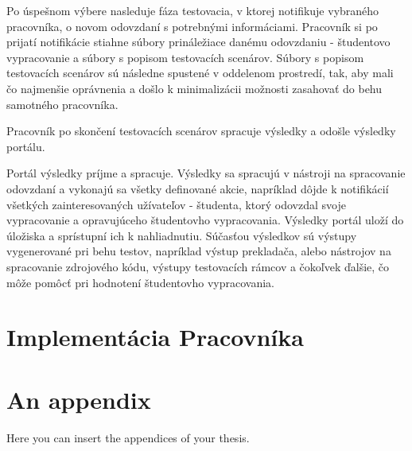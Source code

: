 \documentclass[
  digital, %
  twoside, %
  table,   %
  lof,     %
  lot,     %
]{fithesis3}
\begin{document}
Po úspešnom výbere nasleduje fáza testovacia, v ktorej notifikuje vybraného pracovníka, o novom odovzdaní s potrebnými informáciami. Pracovník si po prijatí notifikácie stiahne súbory prináležiace danému odovzdaniu - študentovo vypracovanie a súbory s popisom testovacích scenárov. Súbory s popisom testovacích scenárov sú následne spustené v oddelenom prostredí, tak, aby mali čo najmenšie oprávnenia a došlo k minimalizácii možnosti zasahovať do behu samotného pracovníka.

Pracovník po skončení testovacích scenárov spracuje výsledky a odošle výsledky portálu.

Portál výsledky príjme a spracuje. Výsledky sa spracujú v nástroji na spracovanie odovzdaní a vykonajú sa všetky definované akcie, napríklad dôjde k notifikácií všetkých zainteresovaných užívateľov - študenta, ktorý odovzdal svoje vypracovanie a opravujúceho študentovho vypracovania. Výsledky portál uloží do úložiska a sprístupní ich k nahliadnutiu. Súčasťou výsledkov sú výstupy vygenerované pri behu testov, napríklad výstup prekladača, alebo nástrojov na spracovanie zdrojového kódu, výstupy testovacích rámcov a čokoľvek ďalšie, čo môže pomôcť pri hodnotení študentovho vypracovania.


\chapter{Implementácia Pracovníka}


\appendix %
\chapter{An appendix}
Here you can insert the appendices of your thesis.
\end{document}
